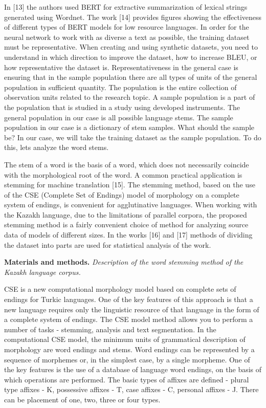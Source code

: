 \begin{multicols}{2}
In {[}13{]} the authors used BERT for extractive summarization of
lexical strings generated using Wordnet. The work {[}14{]} provides
figures showing the effectiveness of different types of BERT models for
low resource languages. In order for the neural network to work with as
diverse a text as possible, the training dataset must be representative.
When creating and using synthetic datasets, you need to understand in
which direction to improve the dataset, how to increase BLEU, or how
representative the dataset is. Representativeness in the general case is
ensuring that in the sample population there are all types of units of
the general population in sufficient quantity. The population is the
entire collection of observation units related to the research topic. A
sample population is a part of the population that is studied in a study
using developed instruments. The general population in our case is all
possible language stems. The sample population in our case is a
dictionary of stem samples. What should the sample be? In our case, we
will take the training dataset as the sample population. To do this,
let\textquotesingle s analyze the word stems.

The stem of a word is the basis of a word, which does not necessarily
coincide with the morphological root of the word. A common practical
application is stemming for machine translation {[}15{]}. The stemming
method, based on the use of the CSE (Complete Set of Endings) model of
morphology on a complete system of endings, is convenient for
agglutinative languages. When working with the Kazakh language, due to
the limitations of parallel corpora, the proposed stemming method is a
fairly convenient choice of method for analyzing source data of models
of different sizes. In the works {[}16{]} and {[}17{]} methods of
dividing the dataset into parts are used for statistical analysis of the
work.

{\bfseries Materials and methods.} \emph{Description of the word stemming
method of the Kazakh language corpus.}

CSE is a new computational morphology model based on complete sets of
endings for Turkic languages. One of the key features of this approach
is that a new language requires only the linguistic resource of that
language in the form of a complete system of endings. The CSE model
method allows you to perform a number of tasks - stemming, analysis and
text segmentation. In the computational CSE model, the minimum units of
grammatical description of morphology are word endings and stems. Word
endings can be represented by a sequence of morphemes or, in the
simplest case, by a single morpheme. One of the key features is the use
of a database of language word endings, on the basis of which operations
are performed. The basic types of affixes are defined - plural type
affixes - K, possessive affixes - T, case affixes - C, personal affixes
- J. There can be placement of one, two, three or four types.


\end{multicols}
